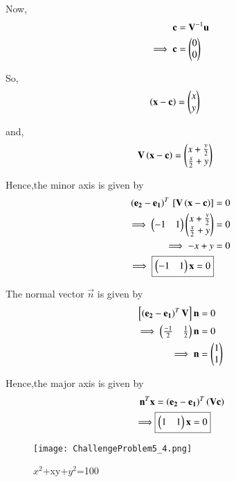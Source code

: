 \documentclass[journal,12pt,twocolumn]{IEEEtran}
\begin{document}
\begin{enumerate}
    Now,
    \begin{align}
    \mathbf{c} &= \mathbf{V}^{-1}\mathbf{u}\\
    \implies \mathbf{c} &= \begin{pmatrix}0 \\ 0\end{pmatrix}
    \end{align}

    So,
    \begin{align}
    \left(\mathbf{x}-\mathbf{c}\right) &= \begin{pmatrix}x \\ y\end{pmatrix}
    \end{align}

    and,
    \begin{align}
    \mathbf{V}\left(\mathbf{x}-\mathbf{c}\right) &= \begin{pmatrix}x+\frac{y}{2} \\ \frac{x}{2} + y\end{pmatrix}
    \end{align}

    Hence,the minor axis is given by
    \begin{align}
    \left(\mathbf{e_2}-\mathbf{e_1}\right)^T{}\left[\mathbf{V}\left(\mathbf{x}-\mathbf{c}\right)\right] &= 0\\
    \implies \begin{pmatrix}-1 & 1\end{pmatrix}\begin{pmatrix}x+\frac{y}{2} \\ \frac{x}{2} + y\end{pmatrix} &= 0 \\
    \implies -x + y &= 0 \\
    \implies \boxed{\begin{pmatrix}-1 & 1\end{pmatrix}\mathbf{x} = 0}
    \end{align}
    
    The normal vector $\vec{n}$ is given by
    \begin{align}
       {}\left[\left(\mathbf{e_2}-\mathbf{e_1}\right)^T\mathbf{V}\right]\mathbf{n} &= 0
        \\
        \implies \begin{pmatrix}\frac{-1}{2} & \frac{1}{2}\end{pmatrix}\mathbf{n} &= 0
        \\
        \implies \mathbf{n} &= \begin{pmatrix}1 \\ 1\end{pmatrix}
    \end{align}
    
    Hence,the major axis is given by
    \begin{align}
        \mathbf{n}^T\mathbf{x} &= \left(\mathbf{e_2}- \mathbf{e_1}\right)^T\left(\mathbf{V}\mathbf{c}\right)
        \\
        \implies &\boxed{\begin{pmatrix}1 & 1\end{pmatrix}\mathbf{x} = 0}
    \end{align}
    
    \begin{figure}[!ht]
    \centering
    \texttt{[image: ChallengeProblem5\_4.png]}
    \caption{$x^2$+xy+$y^2$=100}
    \label{ex4}	
    \end{figure}
    

\end{enumerate}
\end{document}
